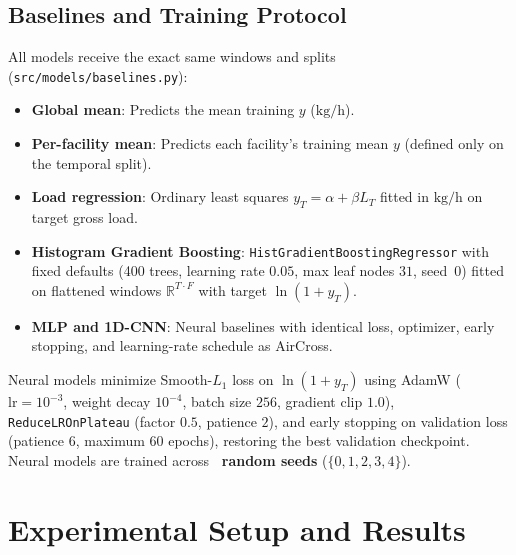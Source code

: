 \documentclass[conference]{IEEEtran}
\begin{document}
\subsection{Baselines and Training Protocol}
All models receive the exact same windows and splits (\texttt{src/models/baselines.py}):
\begin{itemize}
    \item \textbf{Global mean}: Predicts the mean training $y$ ($\text{kg/h}$).
    \item \textbf{Per-facility mean}: Predicts each facility's training mean $y$ (defined only on the temporal split).
    \item \textbf{Load regression}: Ordinary least squares $y_T = \alpha + \beta L_T$ fitted in $\text{kg/h}$ on target gross load.
    \item \textbf{Histogram Gradient Boosting}: \texttt{HistGradientBoostingRegressor} with fixed defaults (400 trees, learning rate $0.05$, max leaf nodes $31$, seed~0) fitted on flattened windows $\mathbb{R}^{T \cdot F}$ with target $\ln(1+y_T)$.
    \item \textbf{MLP and 1D-CNN}: Neural baselines with identical loss, optimizer, early stopping, and learning-rate schedule as AirCross.
\end{itemize}
Neural models minimize Smooth-$L_1$ loss on $\ln(1+y_T)$ using AdamW ($\text{lr} = 10^{-3}$, weight decay $10^{-4}$, batch size $256$, gradient clip $1.0$), \texttt{ReduceLROnPlateau} (factor $0.5$, patience $2$), and early stopping on validation loss (patience $6$, maximum $60$ epochs), restoring the best validation checkpoint. Neural models are trained across \textbf{\NSeeds~random seeds} ($\{0, 1, 2, 3, 4\}$).

\section{Experimental Setup and Results}
\label{sec:results}
\end{document}
